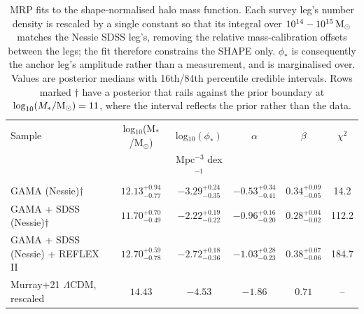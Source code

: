 \begin{table}
\centering
\caption{MRP fits to the shape-normalised halo mass function.  Each survey leg's number density is rescaled by a single constant so that its integral over $10^{14}-10^{15}\,{\rm M}_\odot$ matches the Nessie SDSS leg's, removing the relative mass-calibration offsets between the legs; the fit therefore constrains the SHAPE only.  $\phi_*$ is consequently the anchor leg's amplitude rather than a measurement, and is marginalised over.  Values are posterior medians with 16th/84th percentile credible intervals.  Rows marked $\dagger$ have a posterior that rails against the prior boundary at $\log_{10}(M_*/{\rm M}_\odot) = 11$, where the interval reflects the prior rather than the data.}
\begin{tabular}{lccccc}
\hline
Sample & log$_{10}$(M$_*$/M$_\odot$) & log$_{10}(\phi_*)$ & $\alpha$ & $\beta$ & $\chi^2$ \\
 & & Mpc$^{-3}$ dex$^{-1}$ & & & \\
\hline
GAMA (Nessie)$\dagger$ & $12.13^{+0.94}_{-0.77}$ & $-3.29^{+0.24}_{-0.35}$ & $-0.53^{+0.34}_{-0.41}$ & $0.34^{+0.09}_{-0.05}$ & 14.2 \\
GAMA + SDSS (Nessie)$\dagger$ & $11.70^{+0.70}_{-0.49}$ & $-2.22^{+0.19}_{-0.22}$ & $-0.96^{+0.16}_{-0.20}$ & $0.28^{+0.04}_{-0.02}$ & 112.2 \\
GAMA + SDSS (Nessie) + REFLEX II & $12.70^{+0.59}_{-0.78}$ & $-2.72^{+0.18}_{-0.36}$ & $-1.03^{+0.28}_{-0.23}$ & $0.38^{+0.07}_{-0.06}$ & 184.7 \\
\hline
Murray+21 $\Lambda$CDM, rescaled & $14.43$ & $-4.53$ & $-1.86$ & $0.71$ & -- \\
\hline
\end{tabular}
\label{tab:mrp_shape}
\end{table}
